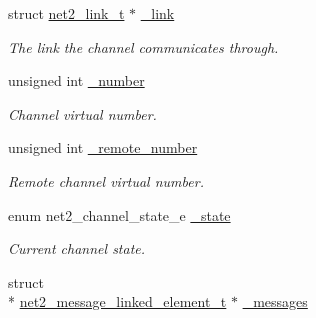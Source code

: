 \begin{DoxyCompactItemize}
\item 
\hypertarget{structnet2__channel__output__t_a8e678b9a5931b8d9d05e29e59cc0fa29}{struct \hyperlink{structnet2__link__t}{net2\-\_\-link\-\_\-t} $\ast$ \hyperlink{structnet2__channel__output__t_a8e678b9a5931b8d9d05e29e59cc0fa29}{\-\_\-link}}\label{structnet2__channel__output__t_a8e678b9a5931b8d9d05e29e59cc0fa29}

\begin{DoxyCompactList}\small\item\em The link the channel communicates through. \end{DoxyCompactList}\item 
\hypertarget{structnet2__channel__output__t_ad271c6722053d44e59fe7e1c50dda193}{unsigned int \hyperlink{structnet2__channel__output__t_ad271c6722053d44e59fe7e1c50dda193}{\-\_\-number}}\label{structnet2__channel__output__t_ad271c6722053d44e59fe7e1c50dda193}

\begin{DoxyCompactList}\small\item\em Channel virtual number. \end{DoxyCompactList}\item 
\hypertarget{structnet2__channel__output__t_af4e5410aaceaef8e8bb17d44b1a28a67}{unsigned int \hyperlink{structnet2__channel__output__t_af4e5410aaceaef8e8bb17d44b1a28a67}{\-\_\-remote\-\_\-number}}\label{structnet2__channel__output__t_af4e5410aaceaef8e8bb17d44b1a28a67}

\begin{DoxyCompactList}\small\item\em Remote channel virtual number. \end{DoxyCompactList}\item 
\hypertarget{structnet2__channel__output__t_a924791491eaed2c9f34f89ebe943abfd}{enum net2\-\_\-channel\-\_\-state\-\_\-e \hyperlink{structnet2__channel__output__t_a924791491eaed2c9f34f89ebe943abfd}{\-\_\-state}}\label{structnet2__channel__output__t_a924791491eaed2c9f34f89ebe943abfd}

\begin{DoxyCompactList}\small\item\em Current channel state. \end{DoxyCompactList}\item 
\hypertarget{structnet2__channel__output__t_a297f9515cb73f62847b127a55ad63a09}{struct \\*
\hyperlink{structnet2__message__linked__element__t}{net2\-\_\-message\-\_\-linked\-\_\-element\-\_\-t} $\ast$ \hyperlink{structnet2__channel__output__t_a297f9515cb73f62847b127a55ad63a09}{\-\_\-messages}}\label{structnet2__channel__output__t_a297f9515cb73f62847b127a55ad63a09}


\end{DoxyCompactItemize}
